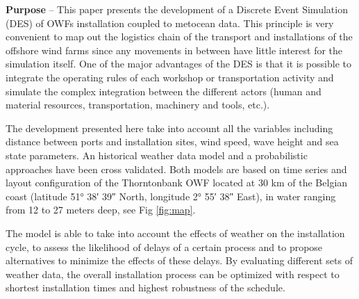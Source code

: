 \textbf{Purpose} --
This paper presents the development of a Discrete Event Simulation (DES) of OWFs installation coupled to metocean data. This principle is very convenient to map out the logistics chain of the transport and installations of the offshore wind farms since any movements in between have little interest for the simulation itself. One of the major advantages of the DES is that it is possible to integrate the operating rules of each workshop or transportation activity and simulate the complex integration between the different actors (human and material resources, transportation, machinery and tools, etc.). 

The development presented here take into account all the variables including distance between ports and installation sites, wind speed, wave height and sea state parameters. An historical weather data model and a probabilistic approaches have been cross validated. Both models are based on time series and layout configuration of the Thorntonbank OWF located at 30 km of the Belgian coast (latitude 51° 38′ 39″ North, longitude 2° 55′ 38″ East), in water ranging from 12 to 27 meters deep, see Fig \ref{fig:map}.

The model is able to take into account the effects of weather on the installation cycle, to assess the likelihood of delays of a certain process and to propose alternatives to minimize the effects of these delays. By evaluating different sets of weather data, the overall installation process can be optimized with respect to shortest installation times and highest robustness of the schedule.


